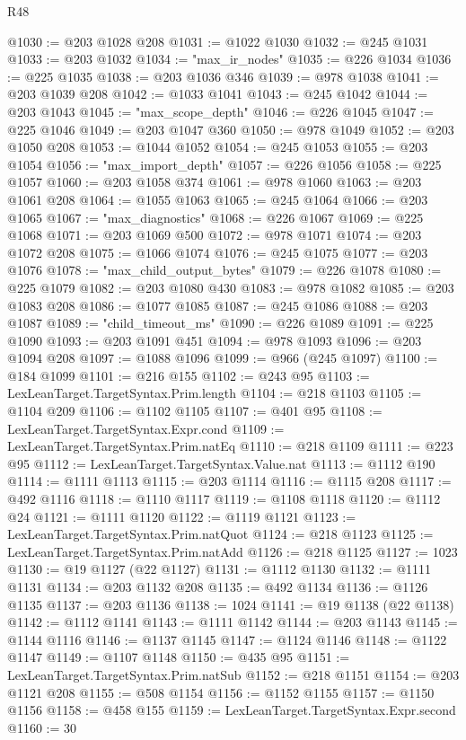 \begin{lexlean}{R48}
\begin{coremodule}
@1030 := @203 @1028 @208
@1031 := @1022 @1030
@1032 := @245 @1031
@1033 := @203 @1032
@1034 := "max_ir_nodes"
@1035 := @226 @1034
@1036 := @225 @1035
@1038 := @203 @1036 @346
@1039 := @978 @1038
@1041 := @203 @1039 @208
@1042 := @1033 @1041
@1043 := @245 @1042
@1044 := @203 @1043
@1045 := "max_scope_depth"
@1046 := @226 @1045
@1047 := @225 @1046
@1049 := @203 @1047 @360
@1050 := @978 @1049
@1052 := @203 @1050 @208
@1053 := @1044 @1052
@1054 := @245 @1053
@1055 := @203 @1054
@1056 := "max_import_depth"
@1057 := @226 @1056
@1058 := @225 @1057
@1060 := @203 @1058 @374
@1061 := @978 @1060
@1063 := @203 @1061 @208
@1064 := @1055 @1063
@1065 := @245 @1064
@1066 := @203 @1065
@1067 := "max_diagnostics"
@1068 := @226 @1067
@1069 := @225 @1068
@1071 := @203 @1069 @500
@1072 := @978 @1071
@1074 := @203 @1072 @208
@1075 := @1066 @1074
@1076 := @245 @1075
@1077 := @203 @1076
@1078 := "max_child_output_bytes"
@1079 := @226 @1078
@1080 := @225 @1079
@1082 := @203 @1080 @430
@1083 := @978 @1082
@1085 := @203 @1083 @208
@1086 := @1077 @1085
@1087 := @245 @1086
@1088 := @203 @1087
@1089 := "child_timeout_ms"
@1090 := @226 @1089
@1091 := @225 @1090
@1093 := @203 @1091 @451
@1094 := @978 @1093
@1096 := @203 @1094 @208
@1097 := @1088 @1096
@1099 := @966 (@245 @1097)
@1100 := @184 @1099
@1101 := @216 @155
@1102 := @243 @95
@1103 := LexLeanTarget.TargetSyntax.Prim.length
@1104 := @218 @1103
@1105 := @1104 @209
@1106 := @1102 @1105
@1107 := @401 @95
@1108 := LexLeanTarget.TargetSyntax.Expr.cond
@1109 := LexLeanTarget.TargetSyntax.Prim.natEq
@1110 := @218 @1109
@1111 := @223 @95
@1112 := LexLeanTarget.TargetSyntax.Value.nat
@1113 := @1112 @190
@1114 := @1111 @1113
@1115 := @203 @1114
@1116 := @1115 @208
@1117 := @492 @1116
@1118 := @1110 @1117
@1119 := @1108 @1118
@1120 := @1112 @24
@1121 := @1111 @1120
@1122 := @1119 @1121
@1123 := LexLeanTarget.TargetSyntax.Prim.natQuot
@1124 := @218 @1123
@1125 := LexLeanTarget.TargetSyntax.Prim.natAdd
@1126 := @218 @1125
@1127 := 1023
@1130 := @19 @1127 (@22 @1127)
@1131 := @1112 @1130
@1132 := @1111 @1131
@1134 := @203 @1132 @208
@1135 := @492 @1134
@1136 := @1126 @1135
@1137 := @203 @1136
@1138 := 1024
@1141 := @19 @1138 (@22 @1138)
@1142 := @1112 @1141
@1143 := @1111 @1142
@1144 := @203 @1143
@1145 := @1144 @1116
@1146 := @1137 @1145
@1147 := @1124 @1146
@1148 := @1122 @1147
@1149 := @1107 @1148
@1150 := @435 @95
@1151 := LexLeanTarget.TargetSyntax.Prim.natSub
@1152 := @218 @1151
@1154 := @203 @1121 @208
@1155 := @508 @1154
@1156 := @1152 @1155
@1157 := @1150 @1156
@1158 := @458 @155
@1159 := LexLeanTarget.TargetSyntax.Expr.second
@1160 := 30

\end{coremodule}
\end{lexlean}

